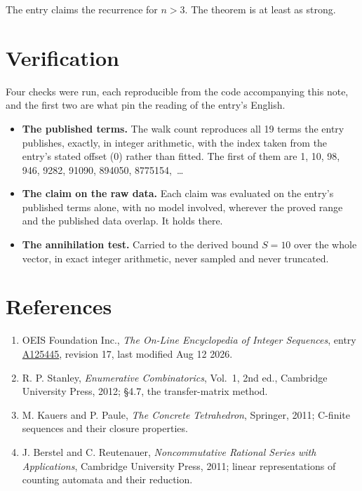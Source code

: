 \documentclass[11pt]{article}
\theoremstyle{definition}
\begin{document}
The entry claims the recurrence for $n > 3$. The theorem is at least as strong.

\section{Verification}

Four checks were run, each reproducible from the code accompanying this note, and the first two are what pin the reading of the entry's English.

\begin{itemize}

\item {\bfseries The published terms.} The walk count reproduces all 19 terms the entry publishes, exactly, in integer arithmetic, with the index taken from the entry's stated offset (0) rather than fitted. The first of them are 1, 10, 98, 946, 9282, 91090, 894050, 8775154,~\dots

\item {\bfseries The claim on the raw data.} Each claim was evaluated on the entry's published terms alone, with no model involved, wherever the proved range and the published data overlap. It holds there.

\item {\bfseries The annihilation test.} Carried to the derived bound $S = 10$ over the whole vector, in exact integer arithmetic, never sampled and never truncated.

\end{itemize}

\section{References}

\begin{enumerate}

\item OEIS Foundation Inc., \emph{The On-Line Encyclopedia of Integer Sequences}, entry \href{https://oeis.org/A125445}{A125445}, revision 17, last modified Aug 12 2026.

\item R. P. Stanley, \emph{Enumerative Combinatorics}, Vol.~1, 2nd ed., Cambridge University Press, 2012; \S4.7, the transfer-matrix method.

\item M. Kauers and P. Paule, \emph{The Concrete Tetrahedron}, Springer, 2011; C-finite sequences and their closure properties.

\item J. Berstel and C. Reutenauer, \emph{Noncommutative Rational Series with Applications}, Cambridge University Press, 2011; linear representations of counting automata and their reduction.

\end{enumerate}
\end{document}
